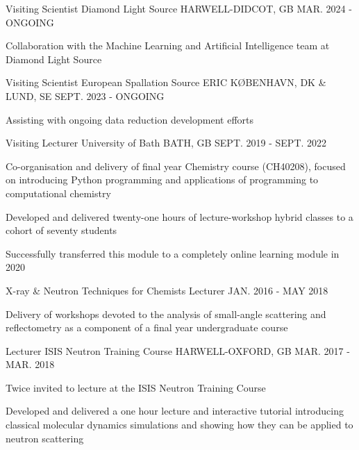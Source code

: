 \begin{cventries}
	\cventry
	{Visiting Scientist}
	{Diamond Light Source}
	{HARWELL-DIDCOT, GB}
	{MAR. 2024 - ONGOING}
	{
		\begin{cvitems}
			\item {Collaboration with the Machine Learning and Artificial Intelligence team at Diamond Light Source}
		\end{cvitems}
	}
	\cventry
	{Visiting Scientist}
	{European Spallation Source ERIC}
	{K\O BENHAVN, DK \& LUND, SE}
	{SEPT. 2023 - ONGOING}
	{
		\begin{cvitems}
			\item {Assisting with ongoing data reduction development efforts}
		\end{cvitems}
	}
	\cventry
	{Visiting Lecturer}
	{University of Bath}
	{BATH, GB}
	{SEPT. 2019 - SEPT. 2022}
	{
		\begin{cvitems}
			\item {Co-organisation and delivery of final year Chemistry course (CH40208), focused on introducing Python programming and applications of programming to computational chemistry}
			\item {Developed and delivered twenty-one hours of lecture-workshop hybrid classes to a cohort of seventy students}
			\item {Successfully transferred this module to a completely online learning module in 2020}
		\end{cvitems}
	}
	\cventry
	{X-ray \& Neutron Techniques for Chemists Lecturer}
	{}
	{}
	{JAN. 2016 - MAY 2018}
	{
		\begin{cvitems}
			\item {Delivery of workshops devoted to the analysis of small-angle scattering and reflectometry as a component of a final year undergraduate course}
		\end{cvitems}
	}
	\cventry
	{Lecturer}
	{ISIS Neutron Training Course}
	{HARWELL-OXFORD, GB}
	{MAR. 2017 - MAR. 2018}
	{
		\begin{cvitems}
			\item {Twice invited to lecture at the ISIS Neutron Training Course}
			\item {Developed and delivered a one hour lecture and interactive tutorial introducing classical molecular dynamics simulations and showing how they can be applied to neutron scattering}
		\end{cvitems}
	}
\end{cventries}
